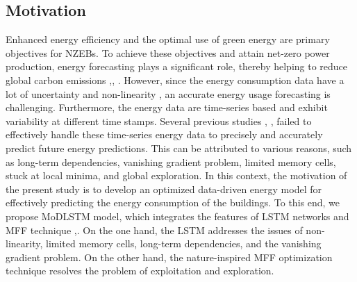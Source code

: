 \documentclass[journal]{IEEEtran}
\begin{document}
\subsection{Motivation}
Enhanced energy efficiency and the optimal use of green energy are primary objectives for NZEBs. To achieve these objectives and attain net-zero power production, energy forecasting plays a significant role, thereby helping to reduce global carbon emissions \cite{Ref2},\cite{Ref26}, \cite{Ref3}. However, 
since the energy consumption data have a lot of uncertainty and non-linearity \cite{ref16},
an accurate energy usage forecasting is challenging. Furthermore, the energy data are time-series based and exhibit variability at different time stamps. Several previous studies \cite{Ref}, \cite{Ref3}, \cite{Ref6} failed to effectively handle these time-series energy data to precisely and accurately predict future energy predictions. This can be attributed to various reasons, such as long-term dependencies, vanishing gradient problem, limited memory cells, stuck at local minima, and global exploration.  
  In this context, the motivation of the present study is to develop an optimized data-driven energy model for effectively predicting the energy consumption of the buildings. To this end, we propose MoDLSTM model, which integrates the features of LSTM networks and MFF technique \cite{Ref11},\cite{Ref12}. On the one hand, the LSTM addresses the issues of non-linearity, limited memory cells, long-term dependencies, and the vanishing gradient problem. On the other hand, the nature-inspired MFF optimization technique resolves the problem of exploitation and exploration.
 
\end{document}
